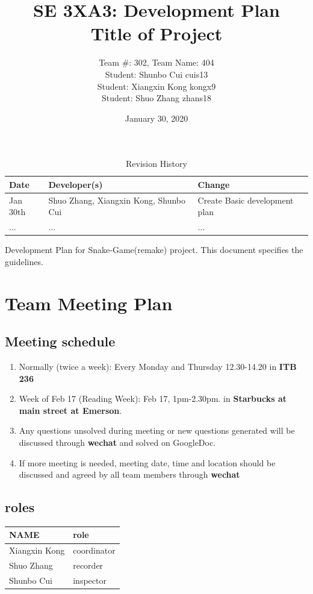 \documentclass{article}
\title{SE 3XA3: Development Plan\\Title of Project}
\author{Team \#: 302, Team Name: 404
		\\ Student: Shunbo Cui	cuis13
		\\ Student: Xiangxin Kong	kongx9
		\\ Student: Shuo Zhang	zhans18
}
\date{January 30, 2020}
\begin{document}
\begin{table}[hp]
\caption{Revision History} \label{TblRevisionHistory}
\begin{tabularx}{\textwidth}{llX}
\toprule
\textbf{Date} & \textbf{Developer(s)} & \textbf{Change}\\
\midrule
Jan 30th & Shuo Zhang, Xiangxin Kong, Shunbo Cui & Create Basic development plan\\
... & ... & ...\\
\bottomrule
\end{tabularx}
\end{table}

\newpage

\maketitle

Development Plan for Snake-Game(remake) project. This document specifies the guidelines.

\section{Team Meeting Plan}
\subsection{Meeting schedule}
\begin{enumerate}
    \item Normally (twice a week): Every Monday and Thursday  12.30-14.20 in \textbf{ITB 236}
    \item Week of Feb 17 (Reading Week): Feb 17, 1pm-2.30pm. in \textbf{Starbucks at main street at Emerson}.
	\item Any questions unsolved during meeting or new questions generated will be discussed through \textbf{wechat} and solved on GoogleDoc.
    \item If more meeting is needed, meeting date, time and location should be discussed and agreed by all team members through \textbf{wechat}
\end{enumerate}
\subsection{roles}
    
    \begin{tabular}{ |l|l| }
        \toprule
        \textbf{NAME} & \textbf{role} \\
        \midrule
        Xiangxin Kong & coordinator \\
        \midrule
        Shuo Zhang & recorder \\
        \midrule
        Shunbo Cui & inspector \\
        \bottomrule
    \end{tabular}
\end{document}
